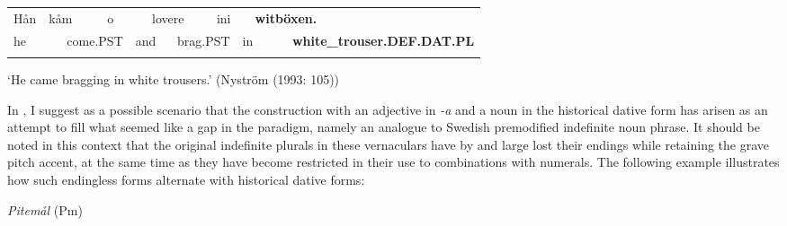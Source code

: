 \begin{tabular}{llllllllllll}
\lsptoprule
Hån & \multicolumn{2}{l}{kåm

} & \multicolumn{2}{l}{o

} & \multicolumn{2}{l}{lovere

} & \multicolumn{2}{l}{ini

} & \multicolumn{2}{l}{{\bfseries witböxen.}

} & \\
\multicolumn{2}{l}{he

} & \multicolumn{2}{l}{come.PST

} & \multicolumn{2}{l}{and

} & \multicolumn{2}{l}{brag.PST

} & \multicolumn{2}{l}{in

} & \multicolumn{2}{l}{{\bfseries white\_trouser.DEF.DAT.PL}

}\\
\lspbottomrule
\end{tabular}

\begin{styleTranslation}
‘He came bragging in white trousers.’ (Nyström (1993: 105))

\end{styleTranslation}

\begin{styleBodyTextFirst}
In \citet{Dahl2008}, I suggest as a possible scenario that the construction with an adjective in\textit{ -a} and a noun in the historical dative form has arisen as an attempt to fill what seemed like a gap in the paradigm, namely an analogue to Swedish premodified indefinite noun phrase. It should be noted in this context that the original indefinite plurals in these vernaculars have by and large lost their endings while retaining the grave pitch accent, at the same time as they have become restricted in their use to combinations with numerals. The following example illustrates how such endingless forms alternate with historical dative forms: 

\end{styleBodyTextFirst}


\begin{listWWNumileveli}
\item 

\begin{styleExample}
\textit{Pitemål} (Pm)

\end{styleExample}

\end{listWWNumileveli}

